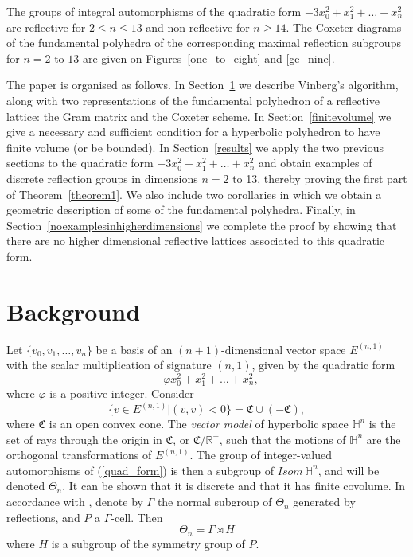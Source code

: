\documentclass[smallcondensed]{svjour3}                     %
\begin{document}
\begin{theorem}\label{theorem1}
The groups of integral automorphisms of the quadratic form $-3x_0^2 + x_1^2 + \ldots + x_n^2$ are reflective for $2\le n\le 13$ and non-reflective for $n \ge 14$. The Coxeter diagrams of the fundamental polyhedra of the corresponding maximal reflection subgroups for $n=2$ to $13$ are given on Figures~\ref{one_to_eight} and \ref{ge_nine}.
\end{theorem}


The paper is organised as follows. In Section~\ref{background} we describe Vinberg's algorithm, along with two representations of the fundamental polyhedron of a reflective lattice: the Gram matrix and the Coxeter scheme. In Section~\ref{finitevolume} we give a necessary and sufficient condition for a hyperbolic polyhedron to have finite volume (or be bounded). In Section~\ref{results} we apply the two previous sections to the quadratic form $-3x_0^2 + x_1^2 + \ldots + x_n^2$ and obtain examples of discrete reflection groups in dimensions $n = 2$ to 13, thereby proving the first part of Theorem~\ref{theorem1}. We also include two corollaries in which we obtain a geometric description of some of the fundamental polyhedra. Finally, in Section~\ref{noexamplesinhigherdimensions} we complete the proof by showing that there are no higher dimensional reflective lattices associated to this quadratic form.

\section{Background}\label{background}
Let $\{v_0, v_1, \ldots, v_n\}$ be a basis of an $(n+1)$-dimensional vector space $E^{(n,1)}$ with the scalar multiplication of signature $(n, 1)$, given by the quadratic form 
\begin{equation} \label{quad_form}
-\varphi x_0^2 + x_1^2 + \ldots + x_n^2,
\end{equation}
where $\varphi$ is a positive integer. Consider
\[\{v \in E^{(n,1)} | (v, v) < 0\} = \mathfrak{C} \cup (-\mathfrak{C}),\]
where $\mathfrak{C}$ is an open convex cone. The \emph{vector model} of hyperbolic space $\mathbb{H}^n$ is the set of rays through the origin in $\mathfrak{C}$, or $\mathfrak{C}/\mathbb{R}^+$, such that the motions of $\mathbb{H}^n$ are the orthogonal transformations of $E^{(n,1)}$. The group of integer-valued automorphisms of (\ref{quad_form}) is then a subgroup of $Isom \, \mathbb{H}^n$, and will be denoted $\Theta_n$. It can be shown that it is discrete and that it has finite covolume. In accordance with \cite{vinberg72(2)}, denote by $\Gamma$ the normal subgroup of $\Theta_n$ generated by reflections, and $P$ a $\Gamma$-cell. Then
\begin{equation}\label{sdproduct}
\Theta_n = \Gamma \rtimes H
\end{equation}
where $H$ is a subgroup of the symmetry group of $P$.
\end{document}
